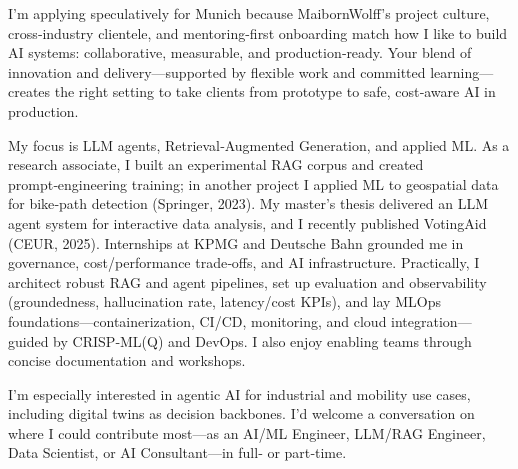 I’m applying speculatively for Munich because MaibornWolff’s project culture, cross‑industry clientele, and mentoring-first onboarding match how I like to build AI systems: collaborative, measurable, and production‑ready. Your blend of innovation and delivery—supported by flexible work and committed learning—creates the right setting to take clients from prototype to safe, cost‑aware AI in production.

My focus is LLM agents, Retrieval‑Augmented Generation, and applied ML. As a research associate, I built an experimental RAG corpus and created prompt‑engineering training; in another project I applied ML to geospatial data for bike‑path detection (Springer, 2023). My master’s thesis delivered an LLM agent system for interactive data analysis, and I recently published VotingAid (CEUR, 2025). Internships at KPMG and Deutsche Bahn grounded me in governance, cost/performance trade‑offs, and AI infrastructure. Practically, I architect robust RAG and agent pipelines, set up evaluation and observability (groundedness, hallucination rate, latency/cost KPIs), and lay MLOps foundations—containerization, CI/CD, monitoring, and cloud integration—guided by CRISP‑ML(Q) and DevOps. I also enjoy enabling teams through concise documentation and workshops.

I’m especially interested in agentic AI for industrial and mobility use cases, including digital twins as decision backbones. I’d welcome a conversation on where I could contribute most—as an AI/ML Engineer, LLM/RAG Engineer, Data Scientist, or AI Consultant—in full‑ or part‑time.